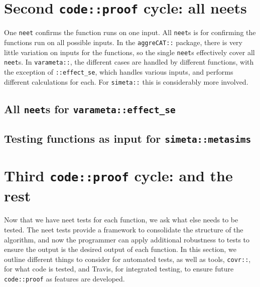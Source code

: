 \documentclass[
]{article}
\begin{document}
\hypertarget{second-codeproof-cycle-all-neets}{%
\section{\texorpdfstring{Second \texttt{code::proof} cycle: all neets}{Second code::proof cycle: all neets}}\label{second-codeproof-cycle-all-neets}}

One \texttt{neet} confirms the function runs on one input. All \texttt{neet}s is for confirming the functions run on all possible inputs. In the \texttt{aggreCAT::} package, there is very little variation on inputs for the functions, so the single \texttt{neet}s effectively cover all \texttt{neet}s. In \texttt{varameta::}, the different cases are handled by different functions, with the exception of \texttt{::effect\_se}, which handles various inputs, and performs different calculations for each. For \texttt{simeta::} this is considerably more involved.

\hypertarget{all-neets-for-varametaeffect_se}{%
\subsection{\texorpdfstring{All \texttt{neet}s for \texttt{varameta::effect\_se}}{All neets for varameta::effect\_se}}\label{all-neets-for-varametaeffect_se}}

\hypertarget{testing-functions-as-input-for-simetametasims}{%
\subsection{\texorpdfstring{Testing functions as input for \texttt{simeta::metasims}}{Testing functions as input for simeta::metasims}}\label{testing-functions-as-input-for-simetametasims}}

\hypertarget{third-codeproof-cycle-and-the-rest}{%
\section{\texorpdfstring{Third \texttt{code::proof} cycle: and the rest}{Third code::proof cycle: and the rest}}\label{third-codeproof-cycle-and-the-rest}}

Now that we have neet tests for each function, we ask what else needs to be tested. The neet tests provide a framework to consolidate the structure of the algorithm, and now the programmer can apply additional robustness to tests to ensure the output is the desired output of each function. In this section, we outline different things to consider for automated tests, as well as tools, \texttt{covr::}, for what code is tested, and Travis, for integrated testing, to ensure future \texttt{code::proof} as features are developed.
\end{document}
